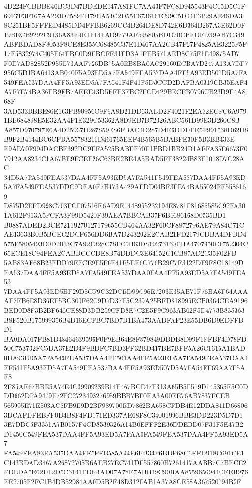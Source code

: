 \documentclass[UTF8,fontset=fandol,zihao=-4,a4paper]{ctexart}
\begin{document}
{{4D224FCBBBE46BC3D47BDEDE147A81FC7AA43F7FC8D945543F4C05D5C1F69F7F3F167AA293D2589EB79EA53C2D55F6736161C99C5D44F3B29AE46DA3
8C251BF5FFFED4485DD4FFBB6269CC4B264DE8D742E6D364B267A3E62D0F19BECB9292C9136A83E9E1F14FAD9779AF595805BDD70CBFDFD39AB7C349
ABFBDAD8F8053F8CE8E355C68485C37E1D467AA2CB47F27F4825AE3225F5F17F5832974C405F64FBC0D9FBCFF31FD3A1FEB571AED8C75F1E49875AD7
F0D7AD82852F955E73AAF726DB75A0EB8BA0AC29160ECBA7D247A13A7DF7956C5D1BA6413AB040F5A93ED5A7FA549FEA537DAA4FF5A93ED507D5A7FA
549FEA537DAA4FF5A93ED5A7FA541F4F41F5D3CCD2DAFBA0319CB35EAF4A7F7E74BA36FB9EB7AEEE43D5EFF3FBC2FCD429BECFB0796CB23D9F4A868F
3AD533BBBE86E163FB90956C9F9A8D21DD63ABD2F4021F2EA32ECFC6A9791BB684898E5E32AA4F1E329C53362A8D9EB7B72326ABC561D99E3D260C8B
A857D970797E6A4D25937D287859E86FBAC4D287D4E6DDDFE5F991538D62D8B9F2B4144BC6CFBA55783211D461765EEF4B565B5BABFE30F5B3BB433E
F9AD70F994DACBF392DC9EFA525BABFE70F1BBD1BB24D1AEFA35E6673F07912AA8234C1A67BE9FCEF26C63BE2BE4A5BAD5FF38224B83E1018D7C28AC
34D5A7FA549FEA537DAA4FF5A93ED5A7FA541F549FEA537DAA4FF5A93ED5A7FA549FEA537DDC9DEA0F7B473A429AFDD04BF3FD74BA55024FF5586169
D875D2EFD998C703FCF07516E6AD9E1448965232194E8781F81686585C92FA301A612F963A5FCFA3F99D5420F39AEA7BBCAB37F6B1686168D0535BD1
B0887ADED2BCE72119270127179655CD464AA32F60CF8872796AE79A84C71CAE13633B0B5BCEC2DCF656DD6BA7D243202E2CAB21FD2179CDBA4DFDD4
575E5805493D0D2043C7A92F328C78FC6B63D819273130EBA4707950C1752304C65ECE18C94FEA2CABDCCCDE8B74DDDC3E64152C1CB87AD2C35F02FB
5AB83AF68B23FDD79EFCE9E5F6F41F5EE6C776B29C7F3122DF9F8C18149DEA537DAA4FF5A93ED5A7FA549FEA537DAA0FAA4FF5A93ED5A7FA549FEA53
7DAA4FF5A93ED5BF29D5CF9C32DCED99C96E7203E35AB71F76BA6F64AAAAF3FB6E8D36EF5BC300F62C9D7D37E5C239A25BFD818996ECB0364CEA9196
BED0D8F3B2BF646CE88D3DB259CFD8E7C2E5F9C963AB62F5D4773B835363B8F520B175999356B4D16ECFBC7BD7D1BA473AADFAF23E55DB6D9EDFFBD1
BA0DA017FB81B48464639596F0F9EB64E8F879849DBDB8D99F1FFBF4D78FD50C753732FC5DA37E2D4F9BDFC7BD3FF32BD417BE7BFF5A26C1615A1BAD
0DA93ED5A7FA549FEA537DAA4FF501AA4FF5A93ED5A7FA549FEA537DAA4FF541F5A93ED5A7FA549FEA537DAA4FF5A93ED507D5A7FA54FF69AA7E5AF8
2F85AE67BBE5A74E4C39909239B14F467BCE47F313A65B5F519D145365F5C0DDD662DFA9479F72FC2723493276959BBB7BF0EA3A00EE76AB7837FCEB
565995E71E503AC3FB9E9D2BF989700ED7862BA658CFDB4E12DDA841D668063DCAFDFEBFF0D4B8F4FD171ED337AE68F8C34001996BBE3DD223D5D7D1
3E7DBC5F3351A7B0157F4CD8539326A14B0EFFF2E36DDEBD07F31F5E47B2D1450C549FEA537DAA4FF5A93ED5A7FAA0FA549FEA537DAA4FF5A93ED5A7
FA549FEA83EA537DAA4FF5FFB585A44E6BB34F6BDF68C6EFD918C691CE1C143BDAD3467A26872705B6AEB27EC741DF557860B7261417AABB7C7BECE2
FDEDA5E62D12D5C3141FD8BAD07A78E7ABB49C90BAA8559656944CEEB976EE2705E2FC1B4DB52984AA0D5B2F48D312FAB1A37A8CE58A367520794B2F
}}
\end{document}
